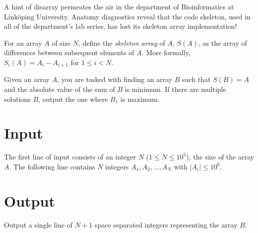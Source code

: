 A hint of disarray permeates the air in the department of Bioinformatics at Linköping University. 
Anatomy diagnostics reveal that the code skeleton, used in all of the department's lab series, has lost its
skeleton array implementation!

For an array $A$ of size $N$, define the \textit{skeleton array} of $A$, $S(A)$, as the array of differences between subsequent elements of $A$. 
More formally, $S_i(A) = A_{i} - A_{i+1}$ for $1 \leq i < N$.


Given an array $A$, you are tasked with finding an array $B$ such that $S(B) = A$ and the absolute value of the sum of $B$ is minimum. If there are multiple solutions $B$, output the one where $B_1$ is maximum.



\section*{Input}
The first line of input consists of an integer $N$ ($1 \leq N \leq 10^5$), the size of the array $A$. The following line contains $N$ integers $A_1, A_2, ..., A_N$ with $|A_i| \leq 10^6$.

\section*{Output}
Output a single line of $N+1$ space separated integers representing the array $B$.